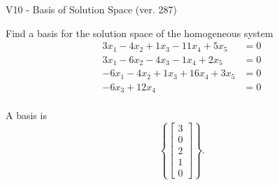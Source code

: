 \begin{exercise}
  \begin{exerciseTitle}V10 - Basis of Solution Space (ver. 287)\end{exerciseTitle}
  \begin{exerciseStatement}
    Find a basis for the solution space of the homogeneous system 
\begin{align*}
 3 x_ 1 -4 x_ 2 + 1 x_ 3 -11 x_ 4 + 5 x_ 5 &= 0  \\ 
  3 x_ 1 -6 x_ 2 -4 x_ 3 -1 x_ 4 + 2 x_ 5 &= 0  \\ 
  -6 x_ 1 -4 x_ 2 + 1 x_ 3 + 16 x_ 4 + 3 x_ 5 &= 0  \\ 
  -6 x_ 3 + 12 x_ 4 &= 0  \\ 
 \end{align*}


 
  \end{exerciseStatement}

  \begin{exerciseAnswer}
   A basis is   
\[\left\{\left[\begin{array}{c}
3 \\
0 \\
2 \\
1 \\
0
\end{array}\right]\right\}.\]

  


  \end{exerciseAnswer}
\end{exercise}